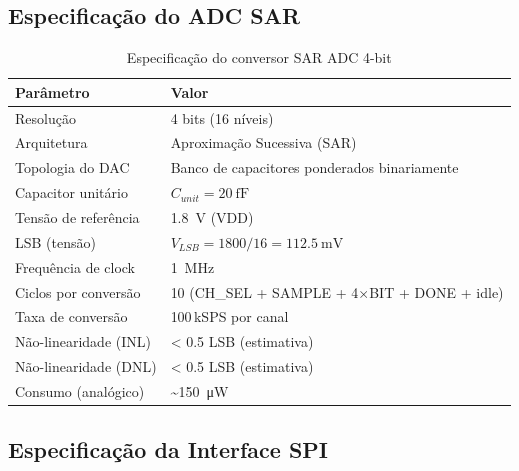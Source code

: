 \documentclass[12pt,a4paper]{article}
\begin{document}
\subsection{Especificação do ADC SAR}

\begin{table}[H]
  \centering
  \caption{Especificação do conversor SAR ADC 4-bit}
  \label{tab:adc_spec}
  \begin{tabular}{ll}
    \toprule
    \textbf{Parâmetro} & \textbf{Valor} \\
    \midrule
    Resolução           & 4 bits (16 níveis) \\
    Arquitetura         & Aproximação Sucessiva (SAR) \\
    Topologia do DAC    & Banco de capacitores ponderados binariamente \\
    Capacitor unitário  & $C_{unit} = \SI{20}{\femto\farad}$ \\
    Tensão de referência & \SI{1.8}{\volt} (VDD) \\
    LSB (tensão)        & $V_{LSB} = 1800/16 = \SI{112.5}{\milli\volt}$ \\
    Frequência de clock & \SI{1}{\mega\hertz} \\
    Ciclos por conversão & 10 (CH\_SEL + SAMPLE + 4$\times$BIT + DONE + idle) \\
    Taxa de conversão   & 100\,kSPS por canal \\
    Não-linearidade (INL) & < 0.5 LSB (estimativa) \\
    Não-linearidade (DNL) & < 0.5 LSB (estimativa) \\
    Consumo (analógico) & \textasciitilde{}\SI{150}{\micro\watt} \\
    \bottomrule
  \end{tabular}
\end{table}

\subsection{Especificação da Interface SPI}
\end{document}
